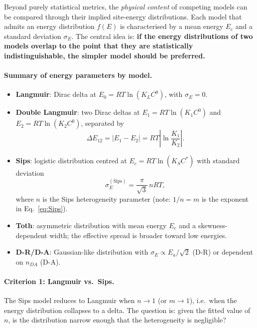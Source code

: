 \documentclass[12pt]{article}
\begin{document}
	Beyond purely statistical metrics, the \emph{physical content} of
	competing models can be compared through their implied site-energy
	distributions. Each model that admits an energy distribution
	$f(E)$ is characterised by a mean energy $E_c$ and a standard
	deviation $\sigma_E$. The central idea is: \textbf{if the energy
	distributions of two models overlap to the point that they are
	statistically indistinguishable, the simpler model should be
	preferred.}

	\paragraph{Summary of energy parameters by model.}

	\begin{itemize}
		\item \textbf{Langmuir}: Dirac delta at
		$E_0 = RT\ln(K_L C^0)$, with $\sigma_E = 0$.
		\item \textbf{Double Langmuir}: two Dirac deltas at
		$E_1 = RT\ln(K_1 C^0)$ and $E_2 = RT\ln(K_2 C^0)$,
		separated by
		\begin{equation}
			\Delta E_{12} = |E_1 - E_2|
			= RT\left|\ln\frac{K_1}{K_2}\right|.
			\label{eq:DeltaE12}
		\end{equation}
		\item \textbf{Sips}: logistic distribution centred at
		$E_c = RT\ln(K_S C^{\ast})$ with standard deviation
		\begin{equation}
			\sigma_E^{\mathrm{(Sips)}}
			= \frac{\pi}{\sqrt{3}}\,nRT,
			\label{eq:sigma_sips_stat}
		\end{equation}
		where $n$ is the Sips heterogeneity parameter (note: $1/n = m$
		is the exponent in Eq.~\eqref{eq:Sips}).
		\item \textbf{Toth}: asymmetric distribution with mean energy
		$E_c$ and a skewness-dependent width; the effective spread is
		broader toward low energies.
		\item \textbf{D-R/D-A}: Gaussian-like distribution with
		$\sigma_E \propto E_a / \sqrt{2}$ (D-R) or dependent on
		$n_{DA}$ (D-A).
	\end{itemize}

	\paragraph{Criterion 1: Langmuir vs.\ Sips.}

	The Sips model reduces to Langmuir when $n \to 1$
	(or $m \to 1$), i.e.\ when the energy distribution collapses to
	a delta. The question is: given the fitted value of $n$, is the
	distribution narrow enough that the heterogeneity is negligible?
\end{document}
